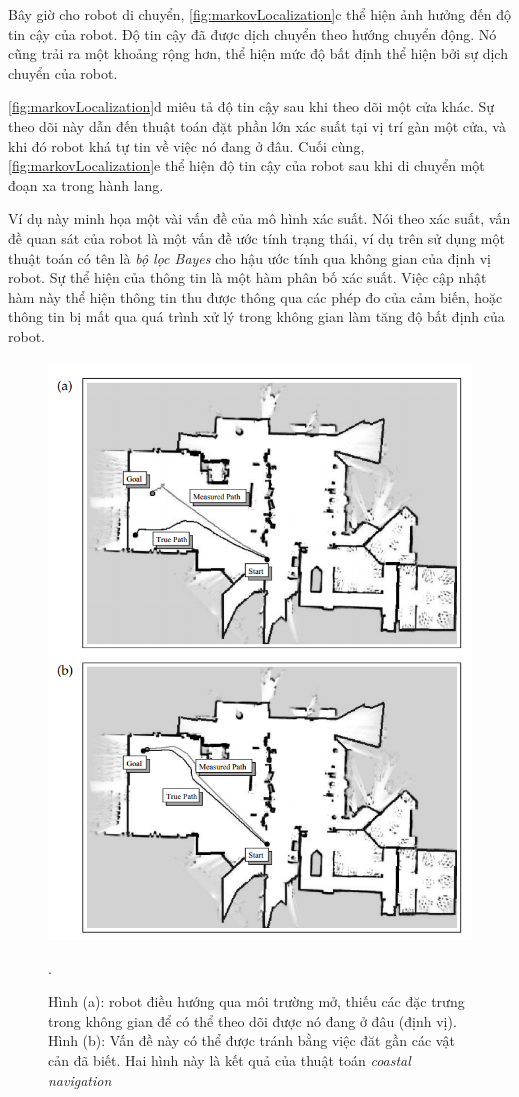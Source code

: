 Bây giờ cho robot di chuyển, \figurename{ \ref{fig:markovLocalization}}c thể hiện ảnh hưởng đến độ tin cậy của robot. Độ tin cậy đã được dịch chuyển theo hướng chuyển động. Nó cũng trải ra một khoảng rộng hơn, thể hiện mức độ bất định thể hiện bởi sự dịch chuyển của robot. \figurename{ \ref{fig:markovLocalization}d miêu tả độ tin cậy sau khi theo dõi một cửa khác. Sự theo dõi này dẫn đến thuật toán đặt phần lớn xác suất tại vị trí gàn một cửa, và khi đó robot khá tự tin về việc nó đang ở đâu. Cuối cùng, \figurename{ \ref{fig:markovLocalization}}e thể hiện độ tin cậy của robot sau khi di chuyển một đoạn xa trong hành lang.

Ví dụ này minh họa một vài vấn đề của mô hình xác suất. Nói theo xác suất, vấn đề quan sát của robot là một vấn đề ước tính trạng thái, ví dụ trên sử dụng một thuật toán có tên là \textit{bộ lọc Bayes} cho hậu ước tính qua không gian của định vị robot. Sự thể hiện của thông tin là một hàm phân bố xác suất. Việc cập nhật hàm này thể hiện thông tin thu được thông qua các phép đo của cảm biến, hoặc thông tin bị mất qua quá trình xử lý trong không gian làm tăng độ bất định của robot.

\begin{figure}[htbp]
  \centering
  \includegraphics[width=0.8\linewidth]{figures/coastal-Navigation.png}
  \caption[Coastal navigation]{Hình (a): robot điều hướng qua môi trường mở, thiếu các đặc trưng trong không gian để có thể theo dõi được nó đang ở đâu (định vị). Hình (b): Vấn đề này có thể được tránh bằng việc đăt gần các vật cản đã biết. Hai hình này là kết quả của thuật toán \textit{coastal navigation} \cite{thrun2005probabilistic}}.
  \label{fig:coastalNavigation}
\end{figure}

}
